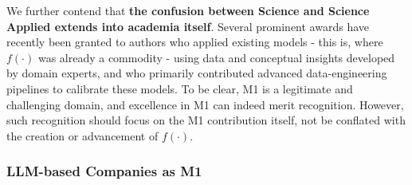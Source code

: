 \documentclass{article}
\begin{document}
We further contend that \textbf{the confusion between Science and Science Applied extends into academia itself}. Several prominent awards have recently been granted to authors who applied existing models - this is, where \begin{math} f(·)\end{math} was already a commodity - using data and conceptual insights developed by domain experts, and who primarily contributed advanced data-engineering pipelines to calibrate these models. To be clear, M1 is a legitimate and challenging domain, and excellence in M1 can indeed merit recognition. However, such recognition should focus on the M1 contribution itself, not be conflated with the creation or advancement of \begin{math} f(·)\end{math}.\\

\subsubsection{LLM-based Companies as M1}
\label{subsubsection: LLM-based Companies as M1}
\end{document}

